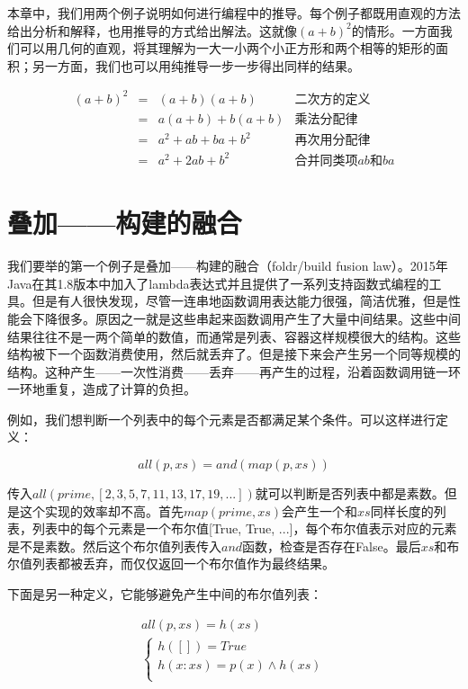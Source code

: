 \documentclass{article}
\begin{document}
本章中，我们用两个例子说明如何进行编程中的推导。每个例子都既用直观的方法给出分析和解释，也用推导的方式给出解法。这就像$(a+b)^2$的情形。一方面我们可以用几何的直观，将其理解为一大一小两个小正方形和两个相等的矩形的面积；另一方面，我们也可以用纯推导一步一步得出同样的结果。

\[
\begin{array}{rcll}
(a + b)^2 & = & (a + b)(a + b) & \text{二次方的定义} \\
          & = & a(a + b) + b(a + b) & \text{乘法分配律} \\
          & = & a^2 + ab + ba + b^2 & \text{再次用分配律} \\
          & = & a^2 + 2ab + b^2 & \text{合并同类项$ab$和$ba$}
\end{array}
\]

\section{叠加——构建的融合}

我们要举的第一个例子是叠加——构建的融合（foldr/build fusion law）。2015年Java在其1.8版本中加入了lambda表达式并且提供了一系列支持函数式编程的工具。但是有人很快发现，尽管一连串地函数调用表达能力很强，简洁优雅，但是性能会下降很多。原因之一就是这些串起来函数调用产生了大量中间结果。这些中间结果往往不是一两个简单的数值，而通常是列表、容器这样规模很大的结构。这些结构被下一个函数消费使用，然后就丢弃了。但是接下来会产生另一个同等规模的结构。这种产生——一次性消费——丢弃——再产生的过程，沿着函数调用链一环一环地重复，造成了计算的负担。

例如\cite{GLPJ-1993}，我们想判断一个列表中的每个元素是否都满足某个条件。可以这样进行定义：

\[
all(p, xs) = and(map(p, xs))
\]

传入$all(prime, [2, 3, 5, 7, 11, 13, 17, 19, ...])$就可以判断是否列表中都是素数。但是这个实现的效率却不高。首先$map(prime, xs)$会产生一个和$xs$同样长度的列表，列表中的每个元素是一个布尔值[True, True, ...]，每个布尔值表示对应的元素是不是素数。然后这个布尔值列表传入$and$函数，检查是否存在False。最后$xs$和布尔值列表都被丢弃，而仅仅返回一个布尔值作为最终结果。

下面是另一种定义，它能够避免产生中间的布尔值列表：

\[
\begin{array}{l}
all(p, xs) = h(xs) \\
  \begin{cases}
  h([]) = True \\
  h(x:xs) = p(x) \land h(xs) \\
  \end{cases}
\end{array}
\]
\end{document}
